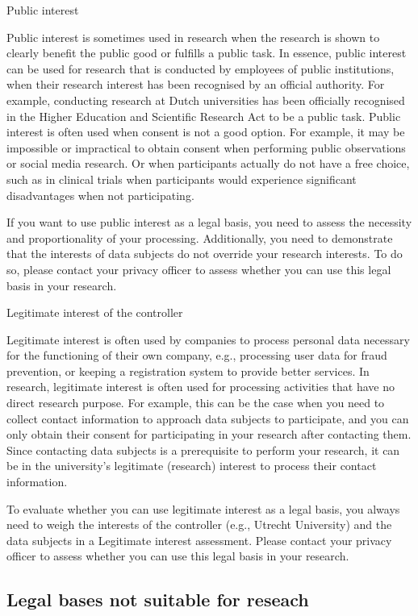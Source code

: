 \documentclass[
]{book}
\begin{document}
Public interest

Public interest is sometimes used in research when the research is shown
to clearly benefit the public good or fulfills a public task. In
essence, public interest can be used for research that is conducted by
employees of public institutions, when their research interest has been
recognised by an official authority. For example, conducting research at
Dutch universities has been officially recognised in the
Higher Education and Scientific Research Act
to be a public task. Public interest is often used when consent is not
a good option. For example, it may be impossible or impractical to
obtain consent when performing public observations or social media
research. Or when participants actually do not have a free choice, such
as in clinical trials when participants would experience significant
disadvantages when not participating.

If you want to use public interest as a legal basis, you
need to assess the necessity and proportionality of your processing.
Additionally, you need to demonstrate that the interests of data
subjects do not override your research interests. To do so, please contact your
privacy officer
to assess whether you can use this legal basis in your research.

Legitimate interest of the controller

Legitimate interest is often used by companies to process personal data
necessary for the functioning of their own company, e.g., processing
user data for fraud prevention, or keeping a registration system to
provide better services. In research, legitimate interest is often used
for processing activities that have no direct research purpose. For
example, this can be the case when you need to collect contact
information to approach data subjects to participate, and you can only
obtain their consent for participating in your research after contacting
them. Since contacting data subjects is a prerequisite to perform your
research, it can be in the university's legitimate (research) interest
to process their contact information.

To evaluate whether you can use legitimate interest as a legal basis, you
always need to weigh the interests of the controller (e.g., Utrecht
University) and the data subjects in a
Legitimate interest assessment.
Please contact your privacy officer to assess whether you can use this
legal basis in your research.

\hypertarget{legal-bases-not-suitable-for-reseach}{%
\subsection{Legal bases not suitable for reseach}\label{legal-bases-not-suitable-for-reseach}}
\end{document}
